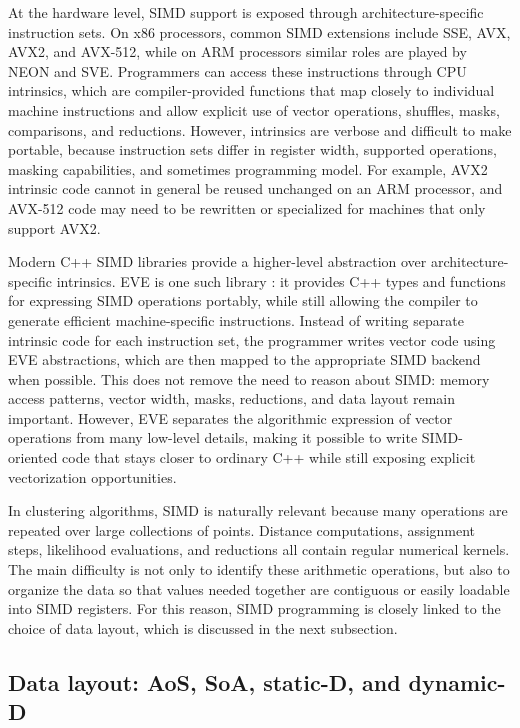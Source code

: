 \documentclass[11pt,a4paper]{article}
\begin{document}
At the hardware level, SIMD support is exposed through architecture-specific instruction sets. On x86 processors, common SIMD extensions include SSE, AVX, AVX2, and AVX-512, while on ARM processors similar roles are played by NEON and SVE. Programmers can access these instructions through CPU intrinsics, which are compiler-provided functions that map closely to individual machine instructions and allow explicit use of vector operations, shuffles, masks, comparisons, and reductions. However, intrinsics are verbose and difficult to make portable, because instruction sets differ in register width, supported operations, masking capabilities, and sometimes programming model. For example, AVX2 intrinsic code cannot in general be reused unchanged on an ARM processor, and AVX-512 code may need to be rewritten or specialized for machines that only support AVX2.

Modern C++ SIMD libraries provide a higher-level abstraction over architecture-specific intrinsics. EVE is one such library \cite{penuchot2018}: it provides C++ types and functions for expressing SIMD operations portably, while still allowing the compiler to generate efficient machine-specific instructions. Instead of writing separate intrinsic code for each instruction set, the programmer writes vector code using EVE abstractions, which are then mapped to the appropriate SIMD backend when possible. This does not remove the need to reason about SIMD: memory access patterns, vector width, masks, reductions, and data layout remain important. However, EVE separates the algorithmic expression of vector operations from many low-level details, making it possible to write SIMD-oriented code that stays closer to ordinary C++ while still exposing explicit vectorization opportunities.

In clustering algorithms, SIMD is naturally relevant because many operations are repeated over large collections of points. Distance computations, assignment steps, likelihood evaluations, and reductions all contain regular numerical kernels. The main difficulty is not only to identify these arithmetic operations, but also to organize the data so that values needed together are contiguous or easily loadable into SIMD registers. For this reason, SIMD programming is closely linked to the choice of data layout, which is discussed in the next subsection.

\subsection{Data layout: AoS, SoA, static-D, and dynamic-D}
\end{document}
